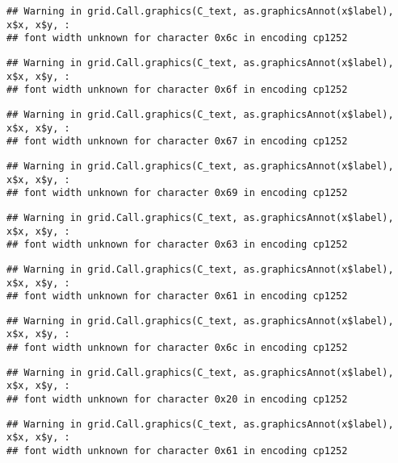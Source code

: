 \documentclass[
]{article}
\begin{document}
\begin{verbatim}
## Warning in grid.Call.graphics(C_text, as.graphicsAnnot(x$label), x$x, x$y, :
## font width unknown for character 0x6c in encoding cp1252
\end{verbatim}

\begin{verbatim}
## Warning in grid.Call.graphics(C_text, as.graphicsAnnot(x$label), x$x, x$y, :
## font width unknown for character 0x6f in encoding cp1252
\end{verbatim}

\begin{verbatim}
## Warning in grid.Call.graphics(C_text, as.graphicsAnnot(x$label), x$x, x$y, :
## font width unknown for character 0x67 in encoding cp1252
\end{verbatim}

\begin{verbatim}
## Warning in grid.Call.graphics(C_text, as.graphicsAnnot(x$label), x$x, x$y, :
## font width unknown for character 0x69 in encoding cp1252
\end{verbatim}

\begin{verbatim}
## Warning in grid.Call.graphics(C_text, as.graphicsAnnot(x$label), x$x, x$y, :
## font width unknown for character 0x63 in encoding cp1252
\end{verbatim}

\begin{verbatim}
## Warning in grid.Call.graphics(C_text, as.graphicsAnnot(x$label), x$x, x$y, :
## font width unknown for character 0x61 in encoding cp1252
\end{verbatim}

\begin{verbatim}
## Warning in grid.Call.graphics(C_text, as.graphicsAnnot(x$label), x$x, x$y, :
## font width unknown for character 0x6c in encoding cp1252
\end{verbatim}

\begin{verbatim}
## Warning in grid.Call.graphics(C_text, as.graphicsAnnot(x$label), x$x, x$y, :
## font width unknown for character 0x20 in encoding cp1252
\end{verbatim}

\begin{verbatim}
## Warning in grid.Call.graphics(C_text, as.graphicsAnnot(x$label), x$x, x$y, :
## font width unknown for character 0x61 in encoding cp1252
\end{verbatim}
\end{document}
